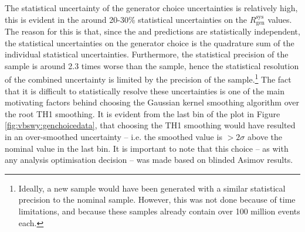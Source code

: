 The statistical uncertainty of the generator choice uncertainties is relatively high, this is evident in the around 20-30\% statistical uncertainties on the $R_{\text{gen}}^{\text{sys}}$ values. The reason for this is that, since the \SHERPA and \MADGRAPH predictions are statistically independent, the statistical uncertainties on the generator choice is the quadrature sum of the individual statistical uncertainties. Furthermore, the statistical precision of the \MADGRAPH sample is around 2.3 times worse than the \SHERPA sample, hence the statistical resolution of the combined uncertainty is limited by the precision of the \MADGRAPH sample.\footnote{Ideally, a new \MADGRAPH sample would have been generated with a similar statistical precision to the nominal \SHERPA sample. However, this was not done because of time limitations, and because these samples already contain over 100 million events each.} The fact that it is difficult to statistically resolve these uncertainties is one of the main motivating factors behind choosing the Gaussian kernel smoothing algorithm over the root TH1 smoothing. It is evident from the last bin of the \leppt plot in Figure \ref{fig:vbswy:genchoicedata}, that choosing the TH1 smoothing would have resulted in an over-smoothed uncertainty -- i.e. the smoothed value is $>2\sigma$ above the nominal value in the last bin. It is important to note that this choice -- as with any analysis optimisation decision -- was made based on blinded Asimov results.%

